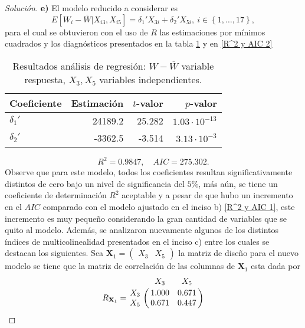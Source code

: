\documentclass[10.5pt,notitlepage]{article}
\newenvironment{solucion}
  {\begin{proof}[Solución]}
  {\end{proof}}
\newcommand{\kis}[1]{\left\{ #1 \right\}}
\theoremstyle{plain}
\begin{document}
\begin{solucion}
\noindent \textbf{e)} El modelo reducido a considerar es 
\begin{equation}\label{reducido1}
   E[W_{i} - \overline{W}| X_{i3}, X_{i5}] =  \delta_{1}' X_{3i} + \delta_{2}' X_{5i}, \ i \in \kis{1, \hdots, 17},
\end{equation}
para el cual se obtuvieron con el uso de \(R\) las estimaciones por mínimos cuadrados y los diagnósticos presentados en la tabla \ref{tab:ref4} y en \eqref{R^2 y AIC 2}
\begin{table}[H]
        \centering
        \begin{tabular}{@{}l@{\hskip 0.3in}r@{\hskip 0.3in}r@{\hskip 0.3in}r@{}}
            \toprule
            Coeficiente& Estimación & \(t\)-valor& \(p\)-valor \\
            \midrule
            \(\delta_{1}'\)&  24189.2   &  25.282 & \(1.03\cdot 10^{-13}\)\\
            \(\delta_{2}'\)& -3362.5   &   -3.514& \(3.13\cdot 10^{-3}\)\\ 
            \bottomrule
        \end{tabular}
        \caption{Resultados análisis de regresión: \(W - \overline{W}\) variable respuesta, \(X_3, X_5\) variables independientes.}
        \label{tab:ref4}
\end{table}
\begin{equation}\label{R^2 y AIC 2}
    R^2 = 0.9847, \quad AIC = 275.302.
\end{equation}
Observe que para este modelo, todos los coeficientes resultan significativamente distintos de cero bajo un nivel de significancia del \(5\%\), más aún, se tiene un coeficiente de determinación \(R^2\) aceptable y a pesar de que hubo un incremento en el \(AIC\) comparado con el modelo ajustado en el inciso b) \eqref{R^2 y AIC 1}, este incremento es muy pequeño considerando la gran cantidad de variables que se quito al modelo. Además, se analizaron nuevamente algunos de los distintos índices de multicolinealidad presentados en el inciso c) entre los cuales se destacan los siguientes. Sea  \(\mathbf{X}_1 = \begin{pmatrix} X_3 & X_5\end{pmatrix}\) la matriz de diseño para el nuevo modelo se tiene que la matriz de correlación de las columnas de \(\mathbf{X}_1\) esta dada por
\begin{equation}\label{corr 2}
R_{\mathbf{X}_{1}} = \bordermatrix{
   & X_3  & X_5\cr
X_3& 1.000& 0.671\cr
X_5& 0.671& 0.447
  }
\end{equation}

\end{solucion}
\end{document}
